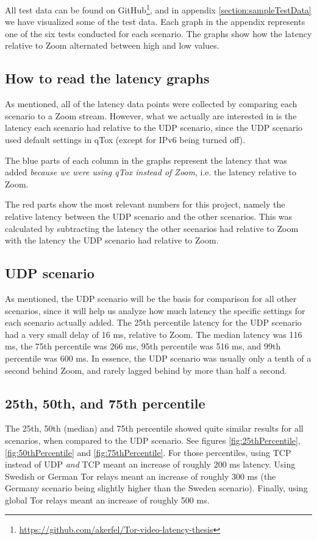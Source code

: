 \documentclass{kththesis}
\begin{document}
All test data can be found on GitHub\footnote{\url{https://github.com/akerfel/Tor-video-latency-thesis}}, and in appendix \ref{section:sampleTestData} we have visualized some of the test data. Each graph in the appendix represents one of the six tests conducted for each scenario. The graphs show how the latency relative to Zoom alternated between high and low values.

\subsection{How to read the latency graphs}
As mentioned, all of the latency data points were collected by comparing each scenario to a Zoom stream. However, what we actually are interested in is the latency each scenario had relative to the UDP scenario, since the UDP scenario used default settings in qTox (except for IPv6 being turned off). 

The blue parts of each column in the graphs represent the latency that was added \emph{because we were using qTox instead of Zoom}, i.e. the latency relative to Zoom.

The red parts show the most relevant numbers for this project, namely the relative latency between the UDP scenario and the other scenarios. This was calculated by subtracting the latency the other scenarios had relative to Zoom with the latency the UDP scenario had relative to Zoom.

\subsection{UDP scenario}
As mentioned, the UDP scenario will be the basis for comparison for all other scenarios, since it will help us analyze how much latency the specific settings for each scenario actually added. The 25th percentile latency for the UDP scenario had a very small delay of 16 ms, relative to Zoom. The median latency was 116 ms, the 75th percentile was 266 ms, 95th percentile was 516 ms, and 99th percentile was 600 ms. In essence, the UDP scenario was usually only a tenth of a second behind Zoom, and rarely lagged behind by more than half a second.

\subsection{25th, 50th, and 75th percentile}
The 25th, 50th (median) and 75th percentile showed quite similar results for all scenarios, when compared to the UDP scenario. See figures \ref{fig:25thPercentile}, \ref{fig:50thPercentile} and \ref{fig:75thPercentile}. For those percentiles, using TCP instead of UDP \emph{and} TCP meant an increase of roughly 200 ms latency. Using Swedish or German Tor relays meant an increase of roughly 300 ms (the Germany scenario being slightly higher than the Sweden scenario). Finally, using global Tor relays meant an increase of roughly 500 ms.
\end{document}
